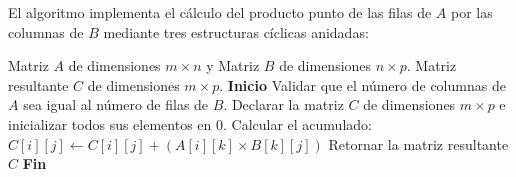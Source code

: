 \documentclass[12pt]{article}
\begin{document}
El algoritmo implementa el cálculo del producto punto de las filas de $A$ por las columnas de $B$ mediante tres estructuras cíclicas anidadas:
\begin{algorithm}[H]
\caption{Multiplicación de dos matrices}
\begin{algorithmic}[1]
    \Require Matriz $A$ de dimensiones $m \times n$ y Matriz $B$ de dimensiones $n \times p$.
    \Ensure Matriz resultante $C$ de dimensiones $m \times p$.
    \State \textbf{Inicio}
    \State Validar que el número de columnas de $A$ sea igual al número de filas de $B$.
    \State Declarar la matriz $C$ de dimensiones $m \times p$ e inicializar todos sus elementos en $0$.
                \State Calcular el acumulado: $C[i][j] \leftarrow C[i][j] + (A[i][k] \times B[k][j])$
            \EndFor
        \EndFor
    \EndFor
    \State Retornar la matriz resultante $C$
    \State \textbf{Fin}
\end{algorithmic}
\end{algorithm}
\end{document}
